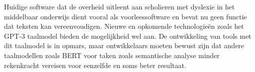 Huidige software dat de overheid uitleent aan scholieren met dyslexie in het middelbaar onderwijs dient vooral als voorleessoftware en bevat nu geen functie dat teksten kan vereenvoudigen. Nieuwe en opkomende technologieën zoals het GPT-3 taalmodel bieden de mogelijkheid wel aan. De ontwikkeling van tools met dit taalmodel is in opmars, maar ontwikkelaars moeten bewust zijn dat andere taalmodellen zoals BERT voor taken zoals semantische analyse minder rekenkracht vereisen voor eenzelfde en soms beter resultaat. 



% 
% 
% 
% 
% 